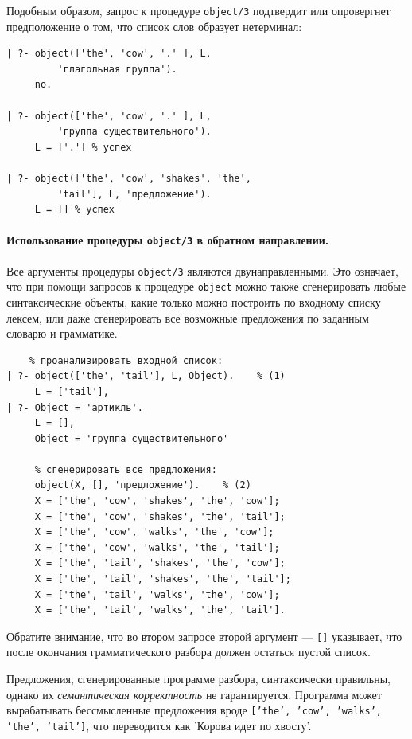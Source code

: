 \documentclass[12pt, openany, twoside]{book} %
\begin{document}
Подобным образом, запрос к процедуре {\tt object/3} подтвердит или опровергнет предположение о том, что список слов образует нетерминал:

{\tt\begin{verbatim}
| ?- object(['the', 'cow', '.' ], L,
         'глагольная группа').
     no.

| ?- object(['the', 'cow', '.' ], L,
         'группа существительного').
     L = ['.'] % успех

| ?- object(['the', 'cow', 'shakes', 'the',
         'tail'], L, 'предложение').
     L = [] % успех
\end{verbatim}}

\paragraph{Использование процедуры {\tt object/3} в обратном направлении.}

Все аргументы процедуры {\tt object/3} являются двунаправленными. Это означает, что при помощи запросов к процедуре {\tt object} можно также сгенерировать любые синтаксические объекты, какие только можно построить по входному списку лексем, или даже сгенерировать все возможные предложения по заданным словарю и грамматике.

{\tt\begin{verbatim}
    % проанализировать входной список:
| ?- object(['the', 'tail'], L, Object).    % (1)
     L = ['tail'],
| ?- Object = 'артикль'.
     L = [],
     Object = 'группа существительного'

     % сгенерировать все предложения:
     object(Х, [], 'предложение').    % (2)
     X = ['the', 'cow', 'shakes', 'the', 'cow'];
     X = ['the', 'cow', 'shakes', 'the', 'tail'];
     X = ['the', 'cow', 'walks', 'the', 'cow'];
     X = ['the', 'cow', 'walks', 'the', 'tail'];
     X = ['the', 'tail', 'shakes', 'the', 'cow'];
     X = ['the', 'tail', 'shakes', 'the', 'tail'];
     X = ['the', 'tail', 'walks', 'the', 'cow'];
     X = ['the', 'tail', 'walks', 'the', 'tail'].
\end{verbatim}}

Обратите внимание, что во втором запросе второй аргумент --- {\tt []} указывает, что после окончания грамматического разбора должен остаться пустой список.

Предложения, сгенерированные программе разбора, синтаксически правильны, однако их \emph{семантическая корректность} не гарантируется. Программа может вырабатывать бессмысленные предложения вроде {\tt  ['the', 'cow', 'walks', 'the', 'tail']}, что переводится как 'Корова идет по хвосту'.
\end{document}
